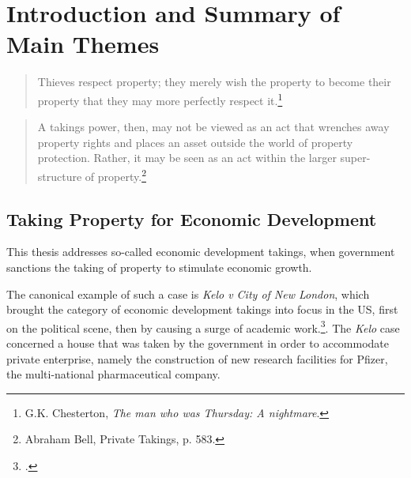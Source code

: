 \chapter{Introduction and Summary of Main Themes}\label{chap:intro}

\begin{quote}
Thieves respect property; they merely wish the property to become their property that they may more perfectly respect it.\footnote{G.K. Chesterton, {\it The man who was Thursday: A nightmare}.}
\end{quote}
\begin{quote}
A takings power, then, may not be viewed as an act that wrenches away property rights and places an asset outside the world of property protection. Rather, it may be seen as an act within the larger super-structure of property.\footnote{Abraham Bell, Private Takings, p. 583.}
\end{quote}
%
%
%
%
\section{Taking Property for Economic Development}

This thesis addresses so-called economic development takings, when government sanctions the taking of property to stimulate economic growth. 

The canonical example of such a case is {\it Kelo v City of New London}, which brought the category of economic development takings into focus in the US, first on the political scene, then by causing a surge of academic work.\footcite{kelo05}. The {\it Kelo} case concerned a house that was taken by the government in order to accommodate private enterprise, namely the construction of new research facilities for Pfizer, the multi-national pharmaceutical company.

